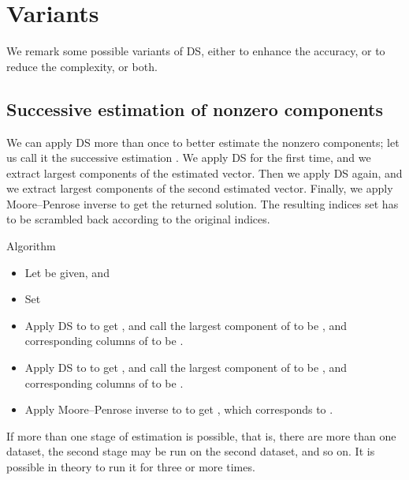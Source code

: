 \section {Variants}

We remark some possible variants of DS, either to enhance the accuracy, or to reduce the complexity, or both.

\subsection {Successive estimation of nonzero components}

We can apply DS more than once to better estimate the nonzero components;
let us call it the successive estimation \cite {CaT07}.
We apply DS for the first time, and we extract largest components of the estimated vector.
Then we apply DS again, and we extract largest components of the second estimated vector.
Finally, we apply Moore–Penrose inverse to get the returned solution.
The resulting indices set has to be scrambled back according to the original indices.

\Result
{Algorithm}
{
\begin {itemize}
\item Let  be given, and 

\item Set

\item Apply DS to  to get , and call the  largest component of  to be , and corresponding columns of  to be .

\item Apply DS to  to get , and call the  largest component of  to be , and corresponding columns of  to be .

\item Apply Moore–Penrose inverse to  to get , which corresponds to .
\end {itemize}
}

If more than one stage of estimation is possible, that is, there are more than one dataset, the second stage may be run on the second dataset, and so on.
It is possible in theory to run it for three or more times.

